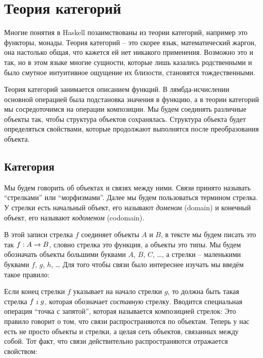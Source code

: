 \chapter{Теория категорий}

Многие понятия в Haskell позаимствованы из теории категорий, например
это функторы, монады. Теория категорий -- это скорее язык,
математический жаргон, она настолько общая, что кажется ей нет никакого
применения. Возможно это и так, но в этом языке многие сущности, которые
лишь казались родственными и было смутное интуитивное ощущение их
близости, становятся тождественными.

Теория категорий занимается описанием функций. В лямбда-исчислении
основной операцией была подстановка значения в функцию, а в теории
категорий мы сосредоточимся на операции композиции. Мы будем соединять
различные объекты так, чтобы структура объектов сохранялась. Структура
объекта будет определяться свойствами, которые продолжают выполнятся
после преобразования объекта.

\section{Категория}

Мы будем говорить об объектах и связях между ними. Связи принято
называть ``стрелками'' или ``морфизмами''. Далее мы будем пользоваться
термином стрелка. У стрелки есть начальный объект, его называют
\emph{доменом} (domain) и конечный объект, его называют \emph{кодоменом}
(codomain).

\begin{centering}



\end{centering}

В этой записи стрелка $f$ соединяет объекты $A$ и $B$, в тексте мы будем
писать это так $f:A \rightarrow B$, словно стрелка это функция, а объекты это
типы. Мы будем обозначать объекты большими буквами $A$, $B$, $C$,
\ldots{}, а стрелки -- маленькими буквами $f$, $g$, $h$, \ldots{} Для
того чтобы связи было интереснее изучать мы введём такое правило:

\begin{centering}



\end{centering}

Если конец стрелки $f$ указывает на начало стрелки $g$, то должна быть
такая стрелка $f \footnotesize\textbf{~;~}\normalsize g$, которая обозначает \emph{составную} стрелку.
Вводится специальная операция ``точка с запятой'', которая называется
композицией стрелок: Это правило говорит о том, что связи
распространяются по объектам. Теперь у нас есть не просто объекты и
стрелки, а целая сеть объектов, связанных между собой. Тот факт, что
связи действительно распространяются отражается свойством:

